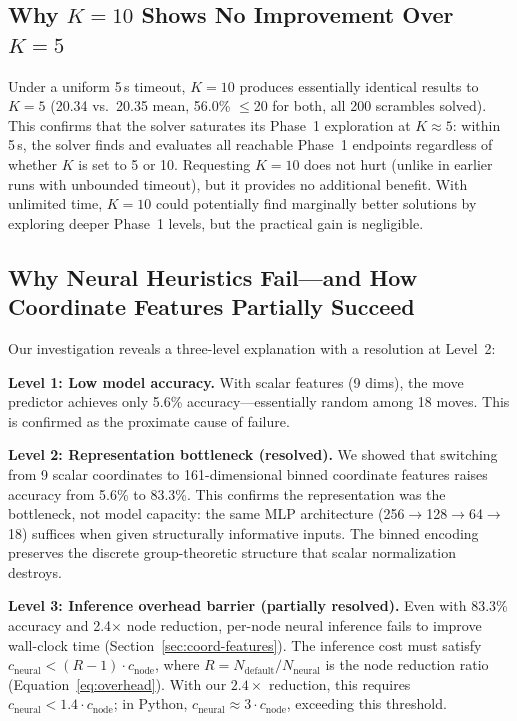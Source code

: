 \documentclass[conference]{IEEEtran}
\begin{document}
\subsection{Why $K{=}10$ Shows No Improvement Over $K{=}5$}

Under a uniform 5\,s timeout, $K{=}10$ produces essentially identical results to $K{=}5$ (20.34 vs.\ 20.35 mean, 56.0\% $\leq$20 for both, all 200 scrambles solved). This confirms that the solver saturates its Phase~1 exploration at $K \approx 5$: within 5\,s, the solver finds and evaluates all reachable Phase~1 endpoints regardless of whether $K$ is set to 5 or 10. Requesting $K{=}10$ does not hurt (unlike in earlier runs with unbounded timeout), but it provides no additional benefit. With unlimited time, $K{=}10$ could potentially find marginally better solutions by exploring deeper Phase~1 levels, but the practical gain is negligible.

\subsection{Why Neural Heuristics Fail---and How Coordinate Features Partially Succeed}

Our investigation reveals a three-level explanation with a resolution at Level~2:

\textbf{Level 1: Low model accuracy.} With scalar features (9 dims), the move predictor achieves only 5.6\% accuracy---essentially random among 18 moves. This is confirmed as the proximate cause of failure.

\textbf{Level 2: Representation bottleneck (resolved).} We showed that switching from 9 scalar coordinates to 161-dimensional binned coordinate features raises accuracy from 5.6\% to 83.3\%. This confirms the representation was the bottleneck, not model capacity: the same MLP architecture (256$\to$128$\to$64$\to$18) suffices when given structurally informative inputs. The binned encoding preserves the discrete group-theoretic structure that scalar normalization destroys.

\textbf{Level 3: Inference overhead barrier (partially resolved).} Even with 83.3\% accuracy and 2.4$\times$ node reduction, per-node neural inference fails to improve wall-clock time (Section~\ref{sec:coord-features}). The inference cost must satisfy $c_{\text{neural}} < (R - 1) \cdot c_{\text{node}}$, where $R = N_{\text{default}}/N_{\text{neural}}$ is the node reduction ratio (Equation~\ref{eq:overhead}). With our $2.4{\times}$ reduction, this requires $c_{\text{neural}} < 1.4 \cdot c_{\text{node}}$; in Python, $c_{\text{neural}} \approx 3 \cdot c_{\text{node}}$, exceeding this threshold.
\end{document}
